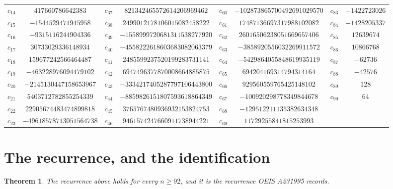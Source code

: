 \documentclass[11pt,a4paper]{article}
\theoremstyle{plain}
\newtheorem{theorem}{Theorem}
\theoremstyle{definition}
\begin{document}
\begin{center}
\begin{tabular}{cccccccc}
$c_{14}$ & $417660786642383$ & $c_{37}$ & $821342465572614206969462$ & $c_{60}$ & $-102873865700492691029570$ & $c_{83}$ & $-1422723026$ \\
$c_{15}$ & $-1544529471945958$ & $c_{38}$ & $2499012178106015082458222$ & $c_{61}$ & $17487136697317988102082$ & $c_{84}$ & $-1428205337$ \\
$c_{16}$ & $-9315116244904336$ & $c_{39}$ & $-1558999720681311538277920$ & $c_{62}$ & $26016506238051669657406$ & $c_{85}$ & $12639674$ \\
$c_{17}$ & $30733029336148934$ & $c_{40}$ & $-4558222618603683082063379$ & $c_{63}$ & $-3858920556032269911572$ & $c_{86}$ & $10866768$ \\
$c_{18}$ & $159677242566464487$ & $c_{41}$ & $2485599237520199283731141$ & $c_{64}$ & $-5429864055848619935119$ & $c_{87}$ & $-62736$ \\
$c_{19}$ & $-463228976094479102$ & $c_{42}$ & $6947496377870008664885875$ & $c_{65}$ & $694204169314794314164$ & $c_{88}$ & $-42576$ \\
$c_{20}$ & $-2145130447158653967$ & $c_{43}$ & $-3334217405287797106443800$ & $c_{66}$ & $929560559765425148102$ & $c_{89}$ & $128$ \\
$c_{21}$ & $5403712782855254339$ & $c_{44}$ & $-8859826151807593618864349$ & $c_{67}$ & $-100920298778349844678$ & $c_{90}$ & $64$ \\
$c_{22}$ & $22905674483474899818$ & $c_{45}$ & $3765767480936932153824753$ & $c_{68}$ & $-129512211135382634348$ &  &  \\
$c_{23}$ & $-49618578713051564738$ & $c_{46}$ & $9461574247660911738944221$ & $c_{69}$ & $11729255841815253993$ &  &  \\
\end{tabular}
\end{center}

\section{The recurrence, and the identification}

\begin{theorem}
The recurrence above holds for every $n\ge92$, and it is the recurrence OEIS A231995 records.
\end{theorem}
\end{document}
